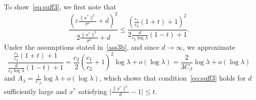 \begin{subappendices}
\begin{prv*}
To show~\eqref{eq:suff3}, we first note that 
$$\frac{(\varepsilon\frac{\lVert x^*\rVert^2}{\sigma^2}+d)^2}{2\frac{\lVert x^*\rVert^2}{\sigma^2}+d} \leq \frac{\left(\frac{c_1}{c_2}(1+t)+1\right)^2}{2\frac{d}{c_2\log\lambda}(1-t)+1}.$$ 
Under the assumptions stated in~\eqref{ass3b}, and since $d\rightarrow\infty$, we approximate $$\frac{\frac{c_1}{c_2}(1+t)+1}{\frac{d}{c_2\log\lambda}(1-t)+1}=\frac{c_2}{2}\left(\frac{c_1}{c_2}+1\right)^2\log \lambda+o(\log \lambda) = \frac{2}{3 C_\beta} \log \lambda+o(\log \lambda)$$ 
and $A_\lambda= \frac{1}{C_\beta}\log \lambda+o(\log\lambda)$, which shows that condition~\ref{eq:suff3} holds for $d$ sufficiently large and $x^*$ satisfying $\lvert\frac{\lVert x^*\rVert^2}{d}-1\rvert\leq t$. 
\end{prv*}


\end{subappendices}
